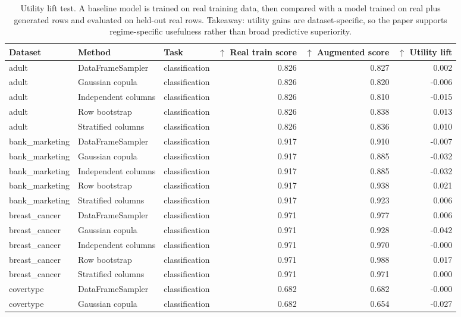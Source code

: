 \begin{table}
\caption{Utility lift test. A baseline model is trained on real training data, then compared with a model trained on real plus generated rows and evaluated on held-out real rows. Takeaway: utility gains are dataset-specific, so the paper supports regime-specific usefulness rather than broad predictive superiority.}
\label{tab:downstream-utility}
\begin{adjustbox}{max width=\textwidth}
\begin{tabular}{lllrrr}
\toprule
Dataset & Method & Task & $\uparrow$ Real train score & $\uparrow$ Augmented score & $\uparrow$ Utility lift \\
\midrule
adult & DataFrameSampler & classification & 0.826 & 0.827 & 0.002 \\
adult & Gaussian copula & classification & 0.826 & 0.820 & -0.006 \\
adult & Independent columns & classification & 0.826 & 0.810 & -0.015 \\
adult & Row bootstrap & classification & 0.826 & 0.838 & 0.013 \\
adult & Stratified columns & classification & 0.826 & 0.836 & 0.010 \\
bank\_marketing & DataFrameSampler & classification & 0.917 & 0.910 & -0.007 \\
bank\_marketing & Gaussian copula & classification & 0.917 & 0.885 & -0.032 \\
bank\_marketing & Independent columns & classification & 0.917 & 0.885 & -0.032 \\
bank\_marketing & Row bootstrap & classification & 0.917 & 0.938 & 0.021 \\
bank\_marketing & Stratified columns & classification & 0.917 & 0.923 & 0.006 \\
breast\_cancer & DataFrameSampler & classification & 0.971 & 0.977 & 0.006 \\
breast\_cancer & Gaussian copula & classification & 0.971 & 0.928 & -0.042 \\
breast\_cancer & Independent columns & classification & 0.971 & 0.970 & -0.000 \\
breast\_cancer & Row bootstrap & classification & 0.971 & 0.988 & 0.017 \\
breast\_cancer & Stratified columns & classification & 0.971 & 0.971 & 0.000 \\
covertype & DataFrameSampler & classification & 0.682 & 0.682 & -0.000 \\
covertype & Gaussian copula & classification & 0.682 & 0.654 & -0.027 \\

\end{tabular}
\end{adjustbox}
\end{table}
